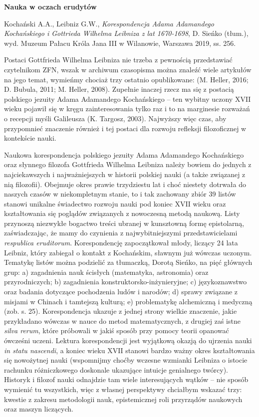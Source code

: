 \documentclass[a4paper]{article}
\title{}
\begin{document}
{\bfseries
Nauka w oczach erudytów}

Kochański A.A., Leibniz G.W., \textit{Korespondencja Adama Adamandego Kochańskiego i Gottrieda Wilhelma Leibniza z lat
1670-1698}, D. Sieńko (tłum.), wyd. Muzeum Pałacu Króla Jana III w Wilanowie, Warszawa 2019, ss. 256.

Postaci Gottfrieda Wilhelma Leibniza nie trzeba z pewnością przedstawiać czytelnikom ZFN, wszak w archiwum czasopisma
można znaleźć wiele artykułów na jego temat, wymieńmy chociaż trzy ostatnio opublikowane: \label{ref:RNDrwfEocyqF0}(M.
Heller, 2016; D. Bubula, 2011; M. Heller, 2008). Zupełnie inaczej rzecz ma się z postacią polskiego jezuity Adama
Adamandego Kochańskiego – ten wybitny uczony XVII wieku pojawił się w kręgu zainteresowania tylko raz i to na
marginesie rozważań o recepcji myśli Galileusza \label{ref:RND9yqTsZs0te}(K. Targosz, 2003). Najwyższy więc czas, aby
przypomnieć znaczenie również i tej postaci dla rozwoju refleksji filozoficznej w kontekście nauki.

Naukowa korespondencja polskiego jezuity Adama Adamandego Kochańskiego oraz słynnego filozofa Gottfrieda Wilhelma
Leibniza należy bowiem do jednych z najciekawszych i najważniejszych w historii polskiej nauki (a także związanej z nią
filozofii). Obejmuje okres prawie trzydziestu lat i choć niestety dotrwała do naszych czasów w niekompletnym stanie, to
i tak zachowany zbiór 39 listów stanowi unikalne świadectwo rozwoju nauki pod koniec XVII wieku oraz kształtowania się
poglądów związanych z nowoczesną metodą naukową. Listy przynoszą niezwykłe bogactwo treści ubranej w kunsztowną formę
epistolarną, zaświadczając, że mamy do czynienia z najwybitniejszymi przedstawicielami \textit{respublica eruditorum}.
Korespondencję zapoczątkował młody, liczący 24 lata Leibniz, który zabiegał o kontakt z Kochańskim, sławnym już wówczas
uczonym. Tematykę listów można podzielić za tłumaczką, Dorotą Sieńko, na pięć głównych grup: a) zagadnienia nauk
ścisłych (matematyka, astronomia) oraz przyrodniczych; b) zagadnienia konstruktorsko-inżynieryjne; c) językoznawstwo
oraz badania dotyczące pochodzenia ludów i narodów; d) sprawy związane z misjami w Chinach i tamtejszą kulturą; e)
problematykę alchemiczną i medyczną (zob. s. 25). Korespondencja ukazuje z jednej strony wielkie znaczenie, jakie
przykładano wówczas w nauce do metod matematycznych, z drugiej zaś istne \textit{silva rerum}, które próbowali w jakiś
sposób przy pomocy teorii opanować ówcześni uczeni. Lektura korespondencji jest wyjątkową okazją do ujrzenia nauki
\textit{in statu nascendi}, a koniec wieku XVII stanowi bardzo ważny okres kształtowania się nowożytnej nauki
(wspomnijmy choćby wczesne wzmianki Leibniza o istocie rachunku różniczkowego doskonale ukazujące intuicje genialnego
twórcy). Historyk i filozof nauki odnajdzie tam wiele interesujących wątków – nie sposób wymienić tu wszystkich, więc z
własnej perspektywy chciałbym wskazać trzy: kwestie z zakresu metodologii nauk, epistemicznej roli przyrządów naukowych
oraz maszyn liczących.
\end{document}
